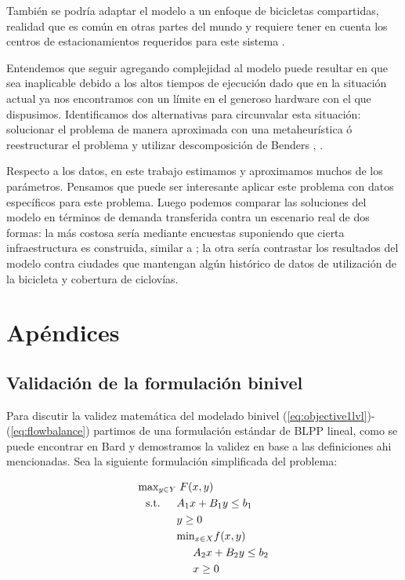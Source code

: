 \documentclass{article}
\newcommand{\modelspace}{\hspace{1.5em}}
\begin{document}
  También se podría adaptar el modelo a un enfoque de bicicletas compartidas, realidad que es común en otras partes del mundo y requiere tener en cuenta los centros de estacionamientos requeridos para este sistema \cite{vogel2016}.

  Entendemos que seguir agregando complejidad al modelo puede resultar en que sea inaplicable debido a los altos tiempos de ejecución dado que en la situación actual ya nos encontramos con un límite en el generoso hardware con el que dispusimos. Identificamos dos alternativas para circunvalar esta situación: solucionar el problema de manera aproximada con una metaheurística ó reestructurar el problema y utilizar descomposición de Benders \cite{bucarey2022}, \cite{Crainic2021}.

  Respecto a los datos, en este trabajo estimamos y aproximamos muchos de los parámetros. Pensamos que puede ser interesante aplicar este problema con datos específicos para este problema. Luego podemos comparar las soluciones del modelo en términos de demanda transferida contra un escenario real de dos formas: la más costosa sería mediante encuestas suponiendo que cierta infraestructura es construida, similar a \cite{shwe2014}; la otra sería contrastar los resultados del modelo contra ciudades que mantengan algún histórico de datos de utilización de la bicicleta y cobertura de ciclovías.

  \newpage
  \section{Apéndices}

  \subsection{Validación de la formulación binivel}
  \label{sect:apendixbilevelvalidation}

  Para discutir la validez matemática del modelado binivel (\ref{eq:objective1lvl})-(\ref{eq:flowbalance}) partimos de una formulación estándar de BLPP lineal, como se puede encontrar en Bard \cite{bardbook} y demostramos la validez en base a las definiciones ahi mencionadas.
  Sea la siguiente formulación simplificada del problema:

  \begin{align}
    \text{max}_{y \in Y}    & \; F(x, y) \label{bilevelgeneric1} \\
    \text{s.t.} \modelspace & A_1 x + B_1 y \leq b_1 \\
                            & y \geq 0 \\
                            & \text{min}_{x \in X} f(x, y) \\
                            & \modelspace A_2 x + B_2 y \leq b_2 \label{bilevelgeneric5} \\
                            & \modelspace x \geq 0 \label{bilevelgeneric6}
  \end{align}
\end{document}
